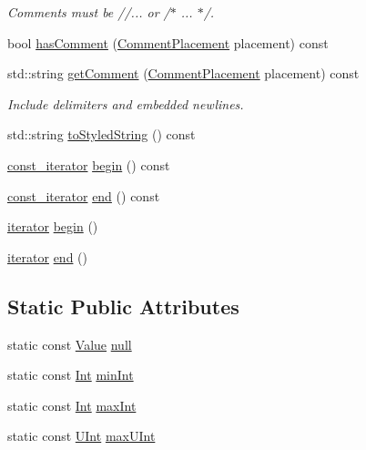 \begin{DoxyCompactItemize}
\begin{DoxyCompactList}\small\item\em Comments must be //... or /$\ast$ ... $\ast$/. \end{DoxyCompactList}\item 
bool \hyperlink{classJson_1_1Value_a06567a00363cab9601be7e31336db03a}{has\-Comment} (\hyperlink{namespaceJson_a4fc417c23905b2ae9e2c47d197a45351}{Comment\-Placement} placement) const 
\item 
std\-::string \hyperlink{classJson_1_1Value_aa1e105b5d7f55d6e42f4fb2f3674116f}{get\-Comment} (\hyperlink{namespaceJson_a4fc417c23905b2ae9e2c47d197a45351}{Comment\-Placement} placement) const 
\begin{DoxyCompactList}\small\item\em Include delimiters and embedded newlines. \end{DoxyCompactList}\item 
std\-::string \hyperlink{classJson_1_1Value_a05357cf78959b790337fae4e5580ee4f}{to\-Styled\-String} () const 
\item 
\hyperlink{classJson_1_1Value_af92282ca92b58b320debd486afb7696a}{const\-\_\-iterator} \hyperlink{classJson_1_1Value_a9d4b9cb50bd804b130c56c44e82cbf3c}{begin} () const 
\item 
\hyperlink{classJson_1_1Value_af92282ca92b58b320debd486afb7696a}{const\-\_\-iterator} \hyperlink{classJson_1_1Value_a496b70a676b2feb850af1c94df44fc14}{end} () const 
\item 
\hyperlink{classJson_1_1Value_a341cdf2e01f8b3c5b7317aa2f0768c53}{iterator} \hyperlink{classJson_1_1Value_acec156770bf554bee85279825d046fad}{begin} ()
\item 
\hyperlink{classJson_1_1Value_a341cdf2e01f8b3c5b7317aa2f0768c53}{iterator} \hyperlink{classJson_1_1Value_a2ac91976a65644bde515280767c7bcde}{end} ()
\end{DoxyCompactItemize}
\subsection*{Static Public Attributes}
\begin{DoxyCompactItemize}
\item 
static const \hyperlink{classJson_1_1Value}{Value} \hyperlink{classJson_1_1Value_aee9d0333219166ddecdb9711a0084f1c}{null}
\item 
static const \hyperlink{classJson_1_1Value_abdf7a7ff73eb130ffcab28504ffdb405}{Int} \hyperlink{classJson_1_1Value_ad062d227e00408ce594026959d6ed2e1}{min\-Int}
\item 
static const \hyperlink{classJson_1_1Value_abdf7a7ff73eb130ffcab28504ffdb405}{Int} \hyperlink{classJson_1_1Value_af13109d78a22923e397dc2b60a74714c}{max\-Int}
\item 
static const \hyperlink{classJson_1_1Value_a0933d59b45793ae4aade1757c322a98d}{U\-Int} \hyperlink{classJson_1_1Value_a905f07575ee561e5b0f0a57e8ea31462}{max\-U\-Int}
\end{DoxyCompactItemize}
